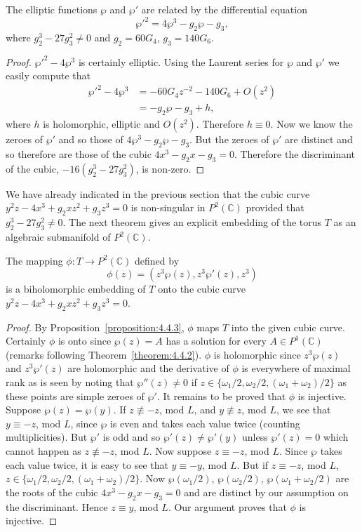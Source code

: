  The elliptic functions $\wp$ and $\wp'$ are related by the differential equation
\[
\wp'^2=4\wp^3-g_2\wp-g_3,
\]
where $g_2^3-27g_3^2\neq0$ and $g_2=60G_4$, $g_3=140G_6$.
\begin{proof}
$\wp'^2-4\wp^3$ is certainly elliptic. Using the Laurent series for $\wp$ and $\wp'$ we easily compute that
\[
\begin{aligned}
\wp'^2-4\wp^3&=-60G_4z^{-2}-140G_6+O(z^2)\\
&=-g_2\wp-g_3+h,
\end{aligned}
\]
where $h$ is holomorphic, elliptic and $O(z^2)$. Therefore $h\equiv0$.
Now we know the zeroes of $\wp'$ and so those of $4\wp^3-g_2\wp-g_3$. But the zeroes of $\wp'$ are distinct and so therefore are those of the cubic $4x^3-g_2x-g_3=0$. Therefore the discriminant of the cubic, $-16(g_2^3-27g_3^2)$, is non-zero.
\end{proof}

We have already indicated in the previous section that the cubic curve $y^2z-4x^3+g_2xz^2+g_3z^3=0$ is non-singular in $P^2(\mathbb C)$ provided that $g_2^3-27g_3^2\neq0$. The next theorem gives an explicit embedding of the torus $T$ as an algebraic submanifold of $P^2(\mathbb C)$.

 The mapping $\phi:T\longrightarrow P^2(\mathbb C)$ defined by
\[
\phi(z)=(z^3\wp(z),z^3\wp'(z),z^3)
\]
is a biholomorphic embedding of $T$ onto the cubic curve $y^2z-4x^3+g_2xz^2+g_3z^3=0$.
\begin{proof}
By Proposition~\ref{proposition:4.4.3}, $\phi$ maps $T$ into the given cubic curve. Certainly $\phi$ is onto since $\wp(z)=A$ has a solution for every $A\in P^1(\mathbb C)$ (remarks following Theorem~\ref{theorem:4.4.2}). $\phi$ is holomorphic since $z^3\wp(z)$ and $z^3\wp'(z)$ are holomorphic and the derivative of $\phi$ is everywhere of maximal rank as is seen by noting that $\wp''(z)\neq0$ if $z\in\{\omega_1/2,\omega_2/2,(\omega_1+\omega_2)/2\}$ as these points are simple zeroes of $\wp'$. It remains to be proved that $\phi$ is injective. Suppose $\wp(z)=\wp(y)$. If $z\not\equiv-z$, mod $L$, and $y\not\equiv z$, mod $L$, we see that $y\equiv-z$, mod $L$, since $\wp$ is even and takes each value twice (counting multiplicities). But $\wp'$ is odd and so $\wp'(z)\neq\wp'(y)$ unless $\wp'(z)=0$ which cannot happen as $z\not\equiv-z$, mod $L$. Now suppose $z\equiv-z$, mod $L$. Since $\wp$ takes each value twice, it is easy to see that $y\equiv-y$, mod $L$. But if $z\equiv-z$, mod $L$, $z\in\{\omega_1/2,\omega_2/2,(\omega_1+\omega_2)/2\}$. Now $\wp(\omega_1/2)$, $\wp(\omega_2/2)$, $\wp(\omega_1+\omega_2/2)$ are the roots of the cubic $4x^3-g_2x-g_3=0$ and are distinct by our assumption on the discriminant. Hence $z\equiv y$, mod $L$. Our argument proves that $\phi$ is injective.
\end{proof}

